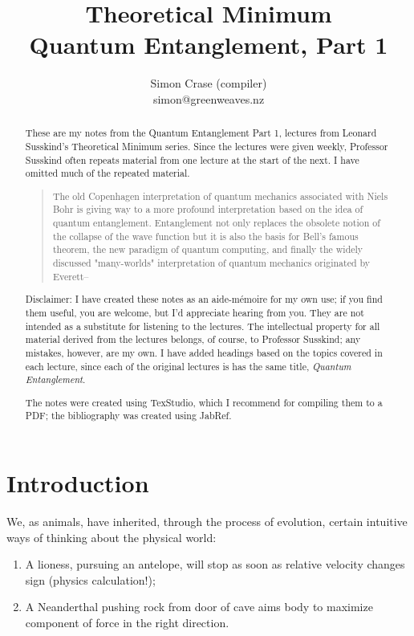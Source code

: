 \documentclass[]{article}
\title{Theoretical Minimum\\Quantum Entanglement, Part 1}
\author{Simon Crase (compiler)\\simon@greenweaves.nz}
\begin{document}
\maketitle

\begin{abstract}
These are my notes from the Quantum Entanglement Part 1, lectures\cite{susskind2013entanglement}  from Leonard Susskind's Theoretical Minimum series\cite{susskind2007theoretical}. Since the lectures were given weekly, Professor Susskind often repeats material from one lecture at the start of the next. I have omitted much of the repeated material.

	\begin{quotation}
		The old Copenhagen interpretation of quantum mechanics associated with Niels Bohr is giving way to a more profound interpretation based on the idea of quantum entanglement. Entanglement not only replaces the obsolete notion of the collapse of the wave function but it is also the basis for Bell's famous theorem, the new paradigm of quantum computing, and finally the widely discussed "many-worlds" interpretation of quantum mechanics originated by Everett--\cite{susskind2013entanglement}
	\end{quotation}

Disclaimer: I have created these notes as an aide-m\'emoire for my own use; if you find them useful, you are welcome, but I'd appreciate hearing from you. They are not intended 
as a substitute for listening to the lectures. The intellectual property for all material derived from the lectures belongs, of course, to Professor Susskind; any mistakes, however, are my own. I have added headings based on the topics covered in each lecture, since each of the original lectures is has the same title, \emph{Quantum Entanglement}.

The notes were created using TexStudio\cite{TexStudio}, which I recommend for compiling them to a PDF; the bibliography was created using JabRef\cite{Jabref}.

\end{abstract}

\tableofcontents
\listoffigures
\listoftables
\listoftheorems[title=List of Theorems and Definitions]

\section{Introduction}

We, as animals, have inherited, through the process of evolution, certain intuitive ways of thinking about the physical world:
\begin{enumerate}
	\item A lioness, pursuing an antelope, will stop as soon as relative velocity changes sign (physics calculation!);
	\item A Neanderthal pushing rock from door of cave aims body to maximize component of force in the right direction.
\end{enumerate}
\end{document}
